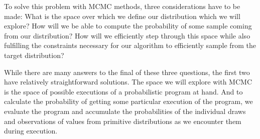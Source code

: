 To solve this problem with MCMC methods, three considerations have to be made: What is the space over which we define our distribution which we will explore? How will we be able to compute the probability of some sample coming from our distribution? How will we efficiently step through this space while also fulfilling the constraints necessary for our algorithm to efficiently sample from the target distribution?

While there are many answers to the final of these three questions, the first two have relatively straightforward solutions. The space we will explore with MCMC is the space of possible executions of a probabilistic program at hand. And to calculate the probability of getting some particular execution of the program, we evaluate the program and accumulate the probabilities of the individual draws and observations of values from primitive distributions as we encounter them during execution.
